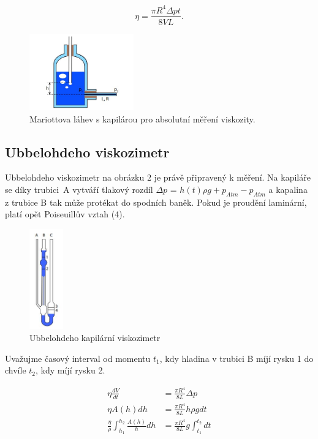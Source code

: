\documentclass[a4paper,11pt]{article}
\begin{document}
\begin{equation}
\eta = \frac{\pi R^4 \Delta p t}{8 V L}.
\end{equation}

\begin{figure}[htpb]
  \centering
  \includegraphics[width=0.4\textwidth]{mariottova_lahev.jpg}
  \caption{Mariottova láhev s kapilárou pro absolutní měření viskozity.}
\end{figure}

\subsection{Ubbelohdeho viskozimetr}

Ubbelohdeho viskozimetr na obrázku 2 je právě připravený k měření. Na kapiláře se díky trubici~A vytváří tlakový rozdíl $\Delta p$ = $h(t) \rho g + p_{Atm} - p_{Atm}$ a kapalina z trubice B tak může protékat do spodních baněk. Pokud je proudění laminární, platí opět Poiseuillův vztah (4).

\begin{figure}[htpb]
  \centering
  \includegraphics[width=0.13\textwidth]{ubbelhdeh.jpg}
  \caption{Ubbelohdeho kapilární viskozimetr}
\end{figure}

Uvažujme časový interval od momentu $t_1$, kdy hladina v trubici B míjí rysku 1 do chvíle $t_2$, kdy míjí rysku 2. 

\begin{align}
  \eta \frac{dV}{dt} &= \frac{\pi R^4}{8 L} \Delta p \\
  \eta A(h) dh &= \frac{\pi R^4}{8 L} h \rho g dt \\
  \frac{\eta}{\rho} \int_{h_1}^{h_2} \frac{A(h)}{h} dh &= \frac{\pi R^4}{8 L} g \int_{t_1}^{t_2} dt 
\end{align}
\end{document}
